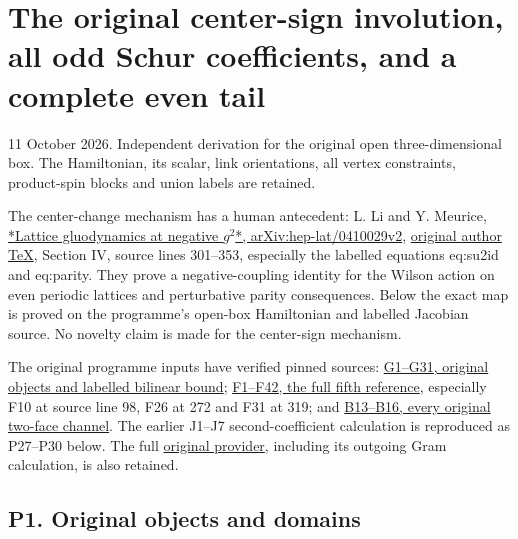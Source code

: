\documentclass[11pt]{article}
\begin{document}
\section*{The original center-sign involution, all odd Schur coefficients, and a complete even tail}

11 October 2026. Independent derivation for the original open three-dimensional box. The Hamiltonian, its scalar, link orientations, all vertex constraints, product-spin blocks and union labels are retained.

The center-change mechanism has a human antecedent: L. Li and Y. Meurice, \href{https://arxiv.org/abs/hep-lat/0410029v2}{*Lattice gluodynamics at negative \(g^2\)*, arXiv:hep-lat/0410029v2}, \href{https://arxiv.org/src/hep-lat/0410029v2}{original author TeX}, Section IV, source lines 301–353, especially the labelled equations eq:su2id and eq:parity. They prove a negative-coupling identity for the Wilson action on even periodic lattices and perturbative parity consequences. Below the exact map is proved on the programme's open-box Hamiltonian and labelled Jacobian source. No novelty claim is made for the center-sign mechanism.

The original programme inputs have verified pinned sources: \href{https://github.com/KokunoYumeto/yang-mills-interacting-workbench/blob/fa79faff2cd697e16cfa3a7953f36810c22c8922/yang-mills/continuations/20260915-gauge-native-band/RESEARCH_NOTE.md}{G1–G31, original objects and labelled bilinear bound}; \href{https://github.com/KokunoYumeto/yang-mills-interacting-workbench/blob/33a4c39de32c2c7fdf6f8ce796e40389f766669f/yang-mills/consolidation/20260921-fifth-reference/package/workbench/yang-mills/continuations/20260921-fifth-reference-return/FIFTH_REFERENCE.md}{F1–F42, the full fifth reference}, especially F10 at source line 98, F26 at 272 and F31 at 319; and \href{https://github.com/KokunoYumeto/yang-mills-interacting-workbench/blob/fa79faff2cd697e16cfa3a7953f36810c22c8922/yang-mills/continuations/20260915-gauge-native-band/BAND_AND_CERTIFICATE.md#L125}{B13–B16, every original two-face channel}. The earlier J1–J7 second-coefficient calculation is reproduced as P27–P30 below. The full \href{https://github.com/KokunoYumeto/yang-mills-interacting-workbench/blob/main/yang-mills/continuations/20261011-central-signs-shrinking-window/BASELINE_J5.md}{original provider}, including its outgoing Gram calculation, is also retained.

\subsection*{P1. Original objects and domains}
\end{document}
